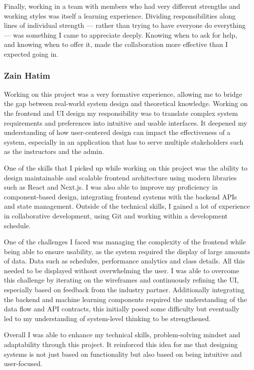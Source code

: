 Finally, working in a team with members who had very different strengths and working styles was itself a learning experience. Dividing responsibilities along lines of individual strength --- rather than trying to have everyone do everything --- was something I came to appreciate deeply. Knowing when to ask for help, and knowing when to offer it, made the collaboration more effective than I expected going in.

\subsubsection{Zain Hatim}

Working on this project was a very formative experience, allowing me to bridge the gap between real-world system design and theoretical knowledge. Working on the frontend and UI design my responsibility was to translate complex system requirements and preferences into intuitive and usable interfaces. It deepened my understanding of how user-centered design can impact the effectiveness of a system, especially in an application that has to serve multiple stakeholders such as the instructors and the admin.

One of the skills that I picked up while working on this project was the ability to design maintainable and scalable frontend architecture using modern libraries such as React and Next.js. I was also able to improve my proficiency in component-based design, integrating frontend systems with the backend APIs and state management. Outside of the technical skills, I gained a lot of experience in collaborative development, using Git and working within a development schedule.

One of the challenges I faced was managing the complexity of the frontend while being able to ensure usability, as the system required the display of large amounts of data. Data such as schedules, performance analytics and class details. All this needed to be displayed without overwhelming the user. I was able to overcome this challenge by iterating on the wireframes and continuously refining the UI, especially based on feedback from the industry partner. Additionally integrating the backend and machine learning components required the understanding of the data flow and API contracts, this initially posed some difficulty but eventually led to my understanding of system-level thinking to be strengthened.

Overall I was able to enhance my technical skills, problem-solving mindset and adaptability through this project. It reinforced this idea for me that designing systems is not just based on functionality but also based on being intuitive and user-focused.


